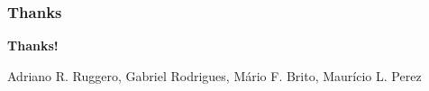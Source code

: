 \documentclass[notes]{beamer}
\begin{document}
\section{}
\begin{frame}
\frametitle{Thanks}
\vskip30pt

\begin{center}
{\bf \color{alert} Thanks!}
\end{center}

\vskip30pt

\begin{center}

\vskip12pt

Adriano R. Ruggero, Gabriel Rodrigues, Mário F. Brito, Maurício L. Perez

\end{center}

\end{frame}
\end{document}
